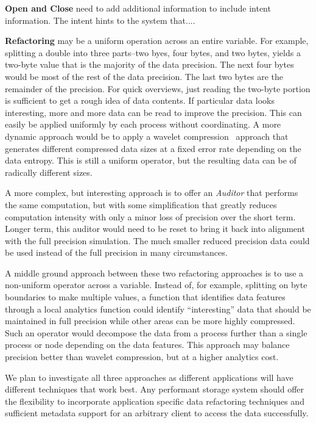 \documentclass{sig-alt-gov2}
\begin{document}
\noindent\textbf{Open and Close} need to add additional information to include
intent information. The intent hints to the system that....

\noindent\textbf{Refactoring} may be a uniform operation across an
entire variable. For example, splitting a double into three parts--two byes,
four bytes, and two bytes, yields a two-byte value that is the majority of the
data precision. The next four bytes would be most of the rest of the data
precision. The last two bytes are the remainder of the precision. For quick
overviews, just reading the two-byte portion is sufficient to get a rough idea
of data contents. If particular data looks interesting, more and more data can
be read to improve the precision. This can easily be applied uniformly by each
process without coordinating. A more dynamic approach would be to apply a
wavelet compression~\cite{wavelet} approach that generates different compressed
data sizes at a fixed error rate depending on the data entropy. This is still a
uniform operator, but the resulting data can be of radically different sizes.

A more complex, but interesting approach is to offer an {\em Auditor} that
performs the same computation, but with some simplification that greatly
reduces computation intensity with only a minor loss of precision over the
short term. Longer term, this auditor would need to be reset to bring it back
into alignment with the full precision simulation. The much smaller reduced
precision data could be used instead of the full precision in many
circumstances.

A middle ground approach between these two refactoring approaches is to use a
non-uniform operator across a variable. Instead of, for example, splitting on
byte boundaries to make multiple values, a function that identifies data
features through a local analytics function could identify ``interesting'' data
that should be maintained in full precision while other areas can be more
highly compressed. Such an operator would decompose the data from a process
further than a single process or node depending on the data features. This
approach may balance precision better than wavelet compression, but at a higher
analytics cost.

We plan to investigate all three approaches as different applications will have
different techniques that work best. Any performant storage system should
offer the flexibility to incorporate application specific data refactoring
techniques and sufficient metadata support for an arbitrary client to access
the data successfully.
\end{document}
